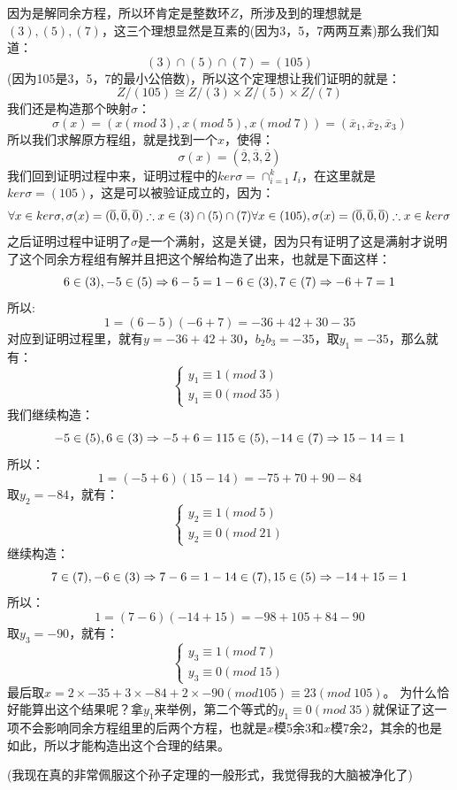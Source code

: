 \documentclass[12pt, a4paper, oneside]{ctexart}
\begin{document}
因为是解同余方程，所以环肯定是整数环$Z$，所涉及到的理想就是$(3),(5),(7)$，这三个理想显然是互素的(因为3，5，7两两互素)那么我们知道：
\[
(3)\cap(5)\cap(7)=(105)
\]
(因为105是3，5，7的最小公倍数)，所以这个定理想让我们证明的就是：
\[
Z/(105)\cong Z/(3)\times Z/(5)\times Z/(7)
\]
我们还是构造那个映射$\sigma$：
\[
\sigma(x)=(x(mod\;3),x(mod\;5),x(mod\;7))=(\overline{x}_1,\overline{x}_2,\overline{x}_3)
\]
所以我们求解原方程组，就是找到一个$x$，使得：
\[
\sigma(x)=(\overline{2},\overline{3},\overline{2})
\]
我们回到证明过程中来，证明过程中的$ker\sigma=\cap_{i=1}^kI_i$，在这里就是$ker\sigma=(105)$，这是可以被验证成立的，因为：
\[
\forall x\in ker\sigma,\sigma(x)=(\overline{0},\overline{0},\overline{0})\therefore x\in (3)\cap(5)\cap(7)\\
\forall x\in (105),\sigma(x)=(\overline{0},\overline{0},\overline{0})\therefore x\in ker\sigma
\]
之后证明过程中证明了$\sigma$是一个满射，这是关键，因为只有证明了这是满射才说明了这个同余方程组有解并且把这个解给构造了出来，也就是下面这样：
\[
6\in (3),-5\in (5)\Rightarrow 6-5=1\\
-6\in (3),7\in (7)\Rightarrow -6+7=1
\]
所以:
\[
1=(6-5)(-6+7)=-36+42+30-35
\]
对应到证明过程里，就有$y=-36+42+30$，$b_2b_3=-35$，取$y_1=-35$，那么就有：
\[
\begin{cases}
y_1\equiv1(mod \; 3)\\
y_1\equiv0(mod \; 35)
\end{cases}
\]
我们继续构造：
\[
-5\in (5),6\in (3)\Rightarrow -5+6=1\\
15\in (5),-14\in (7)\Rightarrow 15-14=1
\]
所以：
\[
1=(-5+6)(15-14)=-75+70+90-84
\]
取$y_2=-84$，就有：
\[
\begin{cases}
y_2\equiv1(mod \; 5)\\
y_2\equiv0(mod \; 21)
\end{cases}
\]
继续构造：
\[
7\in (7),-6\in (3)\Rightarrow 7-6=1\\
-14\in (7),15\in (5)\Rightarrow-14+15=1
\]
所以：
\[
1=(7-6)(-14+15)=-98+105+84-90
\]
取$y_3=-90$，就有：
\[
\begin{cases}
y_3\equiv1(mod \; 7)\\
y_3\equiv0(mod \; 15)
\end{cases}
\]
最后取$x=2\times-35+3\times-84+2\times-90(mod 105)\equiv23(mod\;105)$。
为什么恰好能算出这个结果呢？拿$y_1$来举例，第二个等式的$y_1\equiv0(mod \;35)$就保证了这一项不会影响同余方程组里的后两个方程，也就是$x$模5余3和$x$模7余2，其余的也是如此，所以才能构造出这个合理的结果。

(我现在真的非常佩服这个孙子定理的一般形式，我觉得我的大脑被净化了)
\end{document}

